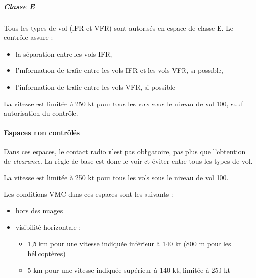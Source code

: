 		\subparagraph{Classe E}
		Tous les types de vol (IFR et VFR) sont autorisés en espace de classe E. Le contrôle assure :
		\begin{itemize}
		\item la séparation entre les vols IFR,
		\item l'information de trafic entre les vols IFR et les vols VFR, si possible,
		\item l'information de trafic entre les vols VFR, si possible
		\end{itemize}
		
		
		
		La vitesse est limitée à 250 kt pour tous les vols sous le niveau de vol 100, sauf autorisation du contrôle.
		
		\paragraph{Espaces non contrôlés}
		Dans ces espaces, le contact radio n'est pas obligatoire, pas plus que l'obtention de \textit{clearance}. La règle de base est donc le voir et éviter entre tous les types de vol.
				
				
		La vitesse est limitée à 250 kt pour tous les vols sous le niveau de vol 100.
		
		Les conditions VMC dans ces espaces sont les suivants :
		\begin{itemize}
			\item hors des nuages
			\item visibilité horizontale :
			\begin{itemize}
				\item 1,5 km pour une vitesse indiquée inférieur à 140 kt (800 m pour les hélicoptères)
				\item 5 km pour une vitesse indiquée supérieur à 140 kt, limitée à 250 kt
			\end{itemize}
		\end{itemize}
		

